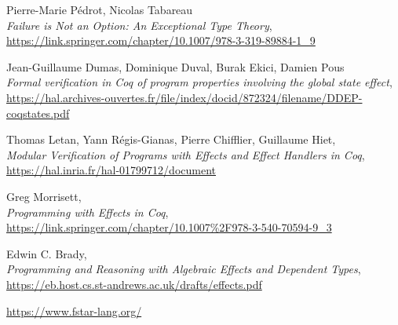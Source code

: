 \documentclass[declaration,inz,english,shortabstract]{iithesis}
\begin{document}
\begin{thebibliography}{1}
        Pierre-Marie Pédrot, Nicolas Tabareau \\
        \textit{Failure is Not an Option: An Exceptional Type Theory}, \\
        \url{https://link.springer.com/chapter/10.1007/978-3-319-89884-1_9}

        Jean-Guillaume Dumas, Dominique Duval, Burak Ekici, Damien Pous \\
        \textit{Formal verification in Coq of program properties involving the global state effect}, \\
        \url{https://hal.archives-ouvertes.fr/file/index/docid/872324/filename/DDEP-coqstates.pdf}

        Thomas Letan, Yann Régis-Gianas, Pierre Chifflier, Guillaume Hiet, \\
        \textit{Modular Verification of Programs with Effects and Effect Handlers in Coq}, \\
        \url{https://hal.inria.fr/hal-01799712/document}

        Greg Morrisett, \\
        \textit{Programming with Effects in Coq}, \\
        \url{https://link.springer.com/chapter/10.1007%2F978-3-540-70594-9_3}

        Edwin C. Brady, \\
        \textit{Programming and Reasoning with Algebraic Effects and Dependent Types}, \\
        \url{https://eb.host.cs.st-andrews.ac.uk/drafts/effects.pdf}

        \url{https://www.fstar-lang.org/}
\end{thebibliography}

\end{document}
